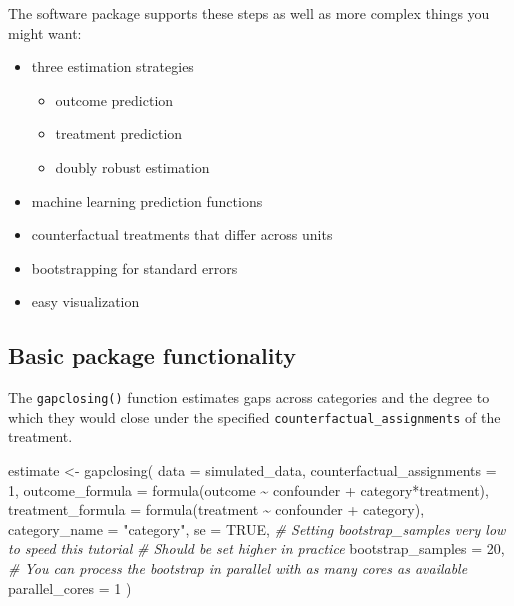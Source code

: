 \documentclass[
]{article}
\newenvironment{Shaded}{\begin{snugshade}}{\end{snugshade}}
\newcommand{\AttributeTok}[1]{\textcolor[rgb]{0.77,0.63,0.00}{#1}}
\newcommand{\CommentTok}[1]{\textcolor[rgb]{0.56,0.35,0.01}{\textit{#1}}}
\newcommand{\ConstantTok}[1]{\textcolor[rgb]{0.00,0.00,0.00}{#1}}
\newcommand{\DecValTok}[1]{\textcolor[rgb]{0.00,0.00,0.81}{#1}}
\newcommand{\FunctionTok}[1]{\textcolor[rgb]{0.00,0.00,0.00}{#1}}
\newcommand{\NormalTok}[1]{#1}
\newcommand{\OtherTok}[1]{\textcolor[rgb]{0.56,0.35,0.01}{#1}}
\newcommand{\SpecialCharTok}[1]{\textcolor[rgb]{0.00,0.00,0.00}{#1}}
\newcommand{\StringTok}[1]{\textcolor[rgb]{0.31,0.60,0.02}{#1}}
\providecommand{\tightlist}{%
  \setlength{\itemsep}{0pt}\setlength{\parskip}{0pt}}
\begin{document}
The software package supports these steps as well as more complex things you might want:

\begin{itemize}
\tightlist
\item
  three estimation strategies

  \begin{itemize}
  \tightlist
  \item
    outcome prediction
  \item
    treatment prediction
  \item
    doubly robust estimation
  \end{itemize}
\item
  machine learning prediction functions
\item
  counterfactual treatments that differ across units
\item
  bootstrapping for standard errors
\item
  easy visualization
\end{itemize}

\hypertarget{basic-package-functionality}{%
\subsection{Basic package functionality}\label{basic-package-functionality}}

The \texttt{gapclosing()} function estimates gaps across categories and the degree to which they would close under the specified \texttt{counterfactual\_assignments} of the treatment.

\begin{Shaded}
\begin{Highlighting}[]
\NormalTok{estimate }\OtherTok{\textless{}{-}} \FunctionTok{gapclosing}\NormalTok{(}
  \AttributeTok{data =}\NormalTok{ simulated\_data,}
  \AttributeTok{counterfactual\_assignments =} \DecValTok{1}\NormalTok{,}
  \AttributeTok{outcome\_formula =} \FunctionTok{formula}\NormalTok{(outcome }\SpecialCharTok{\textasciitilde{}}\NormalTok{ confounder }\SpecialCharTok{+}\NormalTok{ category}\SpecialCharTok{*}\NormalTok{treatment),}
  \AttributeTok{treatment\_formula =} \FunctionTok{formula}\NormalTok{(treatment }\SpecialCharTok{\textasciitilde{}}\NormalTok{ confounder }\SpecialCharTok{+}\NormalTok{ category),}
  \AttributeTok{category\_name =} \StringTok{"category"}\NormalTok{,}
  \AttributeTok{se =} \ConstantTok{TRUE}\NormalTok{,}
  \CommentTok{\# Setting bootstrap\_samples very low to speed this tutorial}
  \CommentTok{\# Should be set higher in practice}
  \AttributeTok{bootstrap\_samples =} \DecValTok{20}\NormalTok{,}
  \CommentTok{\# You can process the bootstrap in parallel with as many cores as available}
  \AttributeTok{parallel\_cores =} \DecValTok{1}
\NormalTok{)}
\end{Highlighting}
\end{Shaded}
\end{document}
